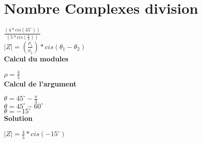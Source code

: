 \newpage
\section{Nombre Complexes division}
\vspace{3mm} %

$\frac{(4 * cis(45^{\circ} ))} {(5 * cis(\frac{\pi}{3}))} $ \\

$|Z| = (\frac{\rho_{1}}{\rho_{2}})* cis(\theta_{1} - \theta_{2})$ \\

\vspace{6mm}
\textbf{Calcul du modules}
\vspace{5mm}

$\rho = \frac{4}{5}$ \\

\vspace{6mm}
\textbf{Calcul de l'argument}
\vspace{5mm}

$\theta = 45^{\circ} - \frac{\pi}{3} $ \\

$\theta = 45^{\circ} - 60^{\circ} $ \\

$\theta = - 15^{\circ} $ \\

\vspace{6mm}
\textbf{Solution}
\vspace{5mm}

$ |Z| = \frac{4}{5} * cis(- 15^{\circ})$ \\
